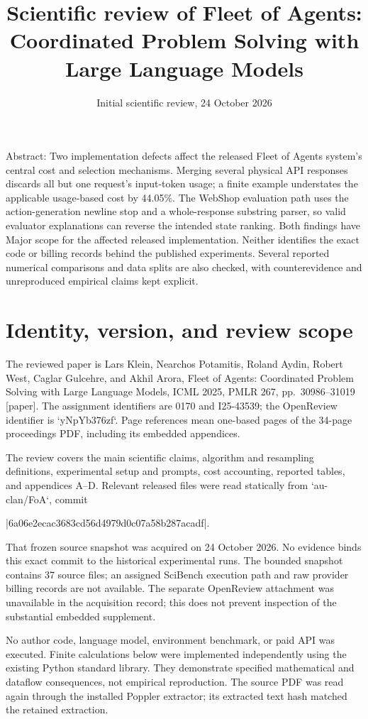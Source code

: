 \documentclass[10pt]{article}
\title{Scientific review of
Fleet of Agents: Coordinated Problem Solving
with Large Language Models}
\author{}
\date{Initial scientific review, 24 October 2026}
\begin{document}
\maketitle
Abstract: Two implementation defects affect the released Fleet of Agents system’s central cost and selection mechanisms. Merging several physical API responses discards all but one request’s input-token usage; a finite example understates the applicable usage-based cost by 44.05\%. The WebShop evaluation path uses the action-generation newline stop and a whole-response substring parser, so valid evaluator explanations can reverse the intended state ranking. Both findings have Major scope for the affected released implementation. Neither identifies the exact code or billing records behind the published experiments. Several reported numerical comparisons and data splits are also checked, with counterevidence and unreproduced empirical claims kept explicit.\par
\section*{Identity, version, and review scope}
The reviewed paper is Lars Klein, Nearchos Potamitis, Roland Aydin, Robert West, Caglar Gulcehre, and Akhil Arora, Fleet of Agents: Coordinated Problem Solving with Large Language Models, ICML 2025, PMLR 267, pp. 30986–31019 [paper]. The assignment identifiers are 0170 and I25-43539; the OpenReview identifier is `yNpYb376zf`. Page references mean one-based pages of the 34-page proceedings PDF, including its embedded appendices.\par
The review covers the main scientific claims, algorithm and resampling definitions, experimental setup and prompts, cost accounting, reported tables, and appendices A–D. Relevant released files were read statically from `au-clan/FoA`, commit\par
|6a06e2ecac3683cd56d4979d0c07a58b287acadf|.\par
That frozen source snapshot was acquired on 24 October 2026. No evidence binds this exact commit to the historical experimental runs. The bounded snapshot contains 37 source files; an assigned SciBench execution path and raw provider billing records are not available. The separate OpenReview attachment was unavailable in the acquisition record; this does not prevent inspection of the substantial embedded supplement.\par
No author code, language model, environment benchmark, or paid API was executed. Finite calculations below were implemented independently using the existing Python standard library. They demonstrate specified mathematical and dataflow consequences, not empirical reproduction. The source PDF was read again through the installed Poppler extractor; its extracted text hash matched the retained extraction.\par
\end{document}
